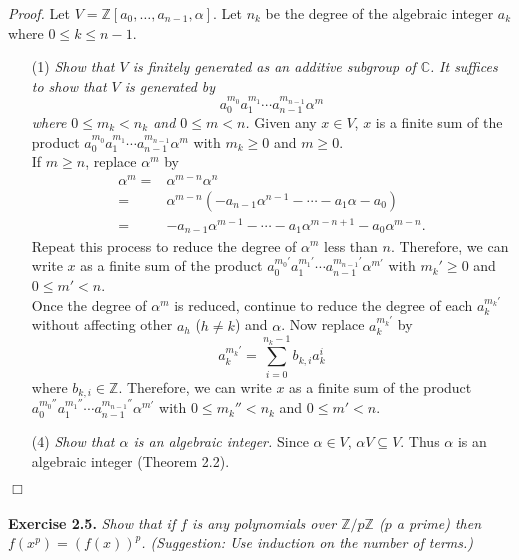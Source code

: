 \documentclass{article}
\begin{document}
\emph{Proof.}
Let $V = \mathbb{Z}[a_0, \ldots, a_{n-1}, \alpha]$.
Let $n_k$ be the degree of the algebraic integer $a_k$ where $0 \leq k \leq n-1$.
\begin{enumerate}
\item[(1)]
\emph{Show that $V$ is finitely generated as an additive subgroup of $\mathbb{C}$.}
\emph{It suffices to show that $V$ is generated by
$$a_0^{m_0} a_1^{m_1} \cdots a_{n-1}^{m_{n-1}} \alpha^m$$
where $0 \leq m_k < n_k$ and $0 \leq m < n$.}
Given any $x \in V$,
$x$ is a finite sum of the product
$a_0^{m_0} a_1^{m_1} \cdots a_{n-1}^{m_{n-1}} \alpha^m$
with $m_k \geq 0$ and $m \geq 0$. \\

If $m \geq n$,
replace $\alpha^m$
by
\begin{align*}
\alpha^m
=& \alpha^{m-n} \alpha^{n} \\
=& \alpha^{m-n} (-a_{n-1} \alpha^{n-1} - \cdots - a_1 \alpha - a_0) \\
=& -a_{n-1} \alpha^{m-1} - \cdots - a_1 \alpha^{m-n+1} - a_0 \alpha^{m-n}.
\end{align*}
Repeat this process to reduce the degree of $\alpha^m$ less than $n$.
Therefore, we can write $x$ as a finite sum of the product
$a_0^{m_0'} a_1^{m_1'} \cdots a_{n-1}^{m_{n-1}'} \alpha^{m'}$
with $m_k' \geq 0$ and $0 \leq m' < n$. \\

Once the degree of $\alpha^m$ is reduced,
continue to reduce the degree of each $a_k^{m_k'}$
without affecting other $a_h$ ($h \neq k$) and $\alpha$.
Now replace $a_k^{m_k'}$
by
$$a_k^{m_k'} = \sum_{i = 0}^{n_k-1} b_{k,i} a_k^{i}$$
where $b_{k,i} \in \mathbb{Z}$.
Therefore, we can write $x$ as a finite sum of the product
$a_0^{m_0''} a_1^{m_1''} \cdots a_{n-1}^{m_{n-1}''} \alpha^{m'}$
with $0 \leq m_k'' < n_k$ and $0 \leq m' < n$.
\item[(4)]
\emph{Show that $\alpha$ is an algebraic integer.}
Since $\alpha \in V$, $\alpha V \subseteq V$.
Thus $\alpha$ is an algebraic integer (Theorem 2.2).
\end{enumerate}
$\Box$ \\\\






\textbf{Exercise 2.5.}
\emph{Show that if $f$ is any polynomials over $\mathbb{Z}/p\mathbb{Z}$ ($p$ a prime)
then $f(x^p) = (f(x))^p$.
(Suggestion: Use induction on the number of terms.)} \\
\end{document}
